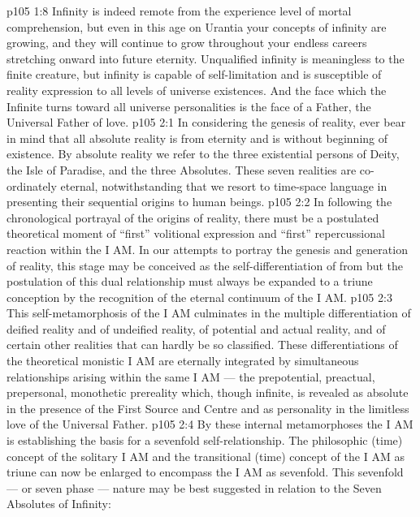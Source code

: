 \vs p105 1:8 Infinity is indeed remote from the experience level of mortal comprehension, but even in this age on Urantia your concepts of infinity are growing, and they will continue to grow throughout your endless careers stretching onward into future eternity. Unqualified infinity is meaningless to the finite creature, but infinity is capable of self\hyp{}limitation and is susceptible of reality expression to all levels of universe existences. And the face which the Infinite turns toward all universe personalities is the face of a Father, the Universal Father of love.
\vs p105 2:1 In considering the genesis of reality, ever bear in mind that all absolute reality is from eternity and is without beginning of existence. By absolute reality we refer to the three existential persons of Deity, the Isle of Paradise, and the three Absolutes. These seven realities are co\hyp{}ordinately eternal, notwithstanding that we resort to time\hyp{}space language in presenting their sequential origins to human beings.
\vs p105 2:2 \pc In following the chronological portrayal of the origins of reality, there must be a postulated theoretical moment of “first” volitional expression and “first” repercussional reaction within the I AM. In our attempts to portray the genesis and generation of reality, this stage may be conceived as the self\hyp{}differentiation of  from  but the postulation of this dual relationship must always be expanded to a triune conception by the recognition of the eternal continuum of  the I AM.
\vs p105 2:3 This self\hyp{}metamorphosis of the I AM culminates in the multiple differentiation of deified reality and of undeified reality, of potential and actual reality, and of certain other realities that can hardly be so classified. These differentiations of the theoretical monistic I AM are eternally integrated by simultaneous relationships arising within the same I AM --- the prepotential, preactual, prepersonal, monothetic prereality which, though infinite, is revealed as absolute in the presence of the First Source and Centre and as personality in the limitless love of the Universal Father.
\vs p105 2:4 By these internal metamorphoses the I AM is establishing the basis for a sevenfold self\hyp{}relationship. The philosophic (time) concept of the solitary I AM and the transitional (time) concept of the I AM as triune can now be enlarged to encompass the I AM as sevenfold. This sevenfold --- or seven phase --- nature may be best suggested in relation to the Seven Absolutes of Infinity:
